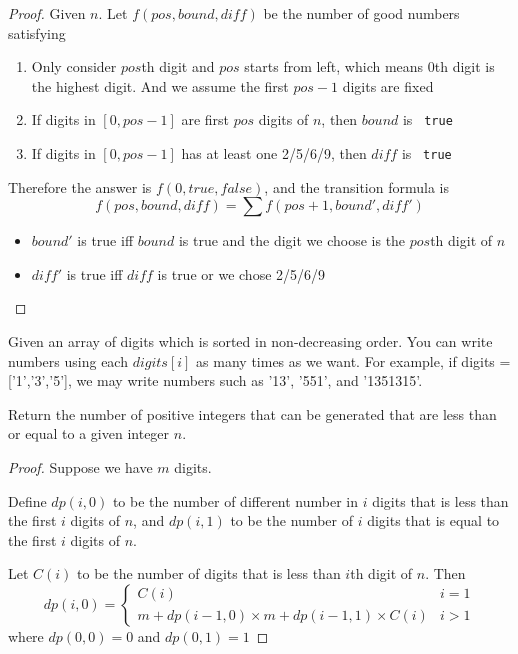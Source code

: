 \documentclass[11pt]{article}
\let\OldTexttt\texttt
\renewcommand{\texttt}[1]{\OldTexttt{\color{MidnightBlue} #1}}
\begin{document}
\begin{proof}
Given \(n\).
Let \(f(pos,bound,diff)\) be the number of good numbers satisfying
\begin{enumerate}
\item Only consider \(pos\)th digit and \(pos\) starts from left, which means 0th digit is the
highest digit. And we assume the first \(pos-1\)
digits are fixed
\item If digits in \([0,pos-1]\) are first \(pos\) digits of \(n\), then \(bound\) is \texttt{true}
\item If digits in \([0,pos-1]\) has at least one 2/5/6/9, then \(diff\) is \texttt{true}
\end{enumerate}

Therefore the answer is \(f(0, true, false)\), and the transition formula is
\begin{equation*}
f(pos,bound,diff)=\sum f(pos+1,bound',diff')
\end{equation*}
\begin{itemize}
\item \(bound'\) is true iff \(bound\) is true and the digit we choose is the \(pos\)th digit
of \(n\)
\item \(diff'\) is true iff \(diff\) is true or we chose 2/5/6/9
\end{itemize}
\end{proof}

\begin{problem}
Given an array of digits which is sorted in non-decreasing order. You can write numbers using
each \(digits[i]\) as many times as we want. For example, if digits = ['1','3','5'], we may write
numbers such as '13', '551', and '1351315'.

Return the number of positive integers that can be generated that are less than or equal to a
given integer \(n\).
\end{problem}

\begin{proof}
Suppose we have \(m\) digits.

Define \(dp(i,0)\) to be the number of different number in \(i\) digits that is less than the
first \(i\) digits of \(n\), and \(dp(i,1)\) to be the number of \(i\) digits that is equal to
the first \(i\) digits of \(n\).

Let \(C(i)\) to be the number of digits that is less than \(i\)th digit of \(n\). Then
\begin{equation*}
dp(i,0)=
\begin{cases}
C(i)&i=1\\
m+dp(i-1,0)\times m+dp(i-1,1)\times C(i)&i>1
\end{cases}
\end{equation*}
where \(dp(0,0)=0\) and \(dp(0,1)=1\)
\end{proof}
\end{document}
